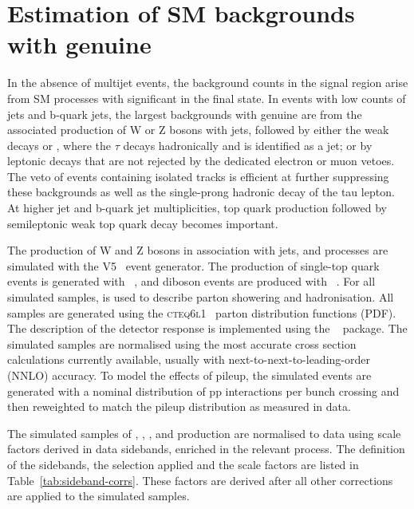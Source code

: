 \section{Estimation of SM backgrounds with genuine \ptvecmiss}
\label{sec:ewk_background}

In the absence of multijet events, the background counts in the signal
region arise from SM processes with significant \ETmiss in the final
state. In events with low counts of jets and b-quark jets, the largest
backgrounds with genuine \ptvecmiss are from the associated production of
W or Z bosons with jets, followed by either the weak decays \znunu or
\wtaunu, where the $\tau$ decays hadronically and is identified as a
jet; or by leptonic decays that are not rejected by the dedicated
electron or muon vetoes. The veto of events containing isolated tracks
is efficient at further suppressing these backgrounds as well as the
single-prong hadronic decay of the tau lepton. At higher jet and
b-quark jet multiplicities, top quark production followed by
semileptonic weak top quark decay becomes important.

The production of W and Z bosons in association with jets, \ttbar and
\gj processes are simulated with the \MADGRAPH V5~\cite{madgraph}
event generator. The production of single-top quark events is
generated with \POWHEG~\cite{powheg}, and diboson events are produced
with ~\cite{pythia8}. For all simulated samples, 
is used to describe parton showering and hadronisation. All samples
are generated using the \textsc{cteq6l1}~\cite{Pumplin:2002vw} parton
distribution functions (PDF). The description of the detector response
is implemented using the \GEANTfour~\cite{geant} package. The
simulated samples are normalised using the most accurate cross section
calculations currently available, usually with
next-to-next-to-leading-order (NNLO) accuracy. To model the effects of
pileup, the simulated events are generated with a nominal distribution
of pp interactions per bunch crossing and then reweighted to match the
pileup distribution as measured in data.

The simulated samples of \gj, \wlj, \zllj, and \ttbar production are
normalised to data using scale factors derived in data sidebands,
enriched in the relevant process. The definition of the sidebands, the
selection applied and the scale factors are listed in
Table~\ref{tab:sideband-corrs}. These factors are derived after all
other corrections are applied to the simulated samples.

